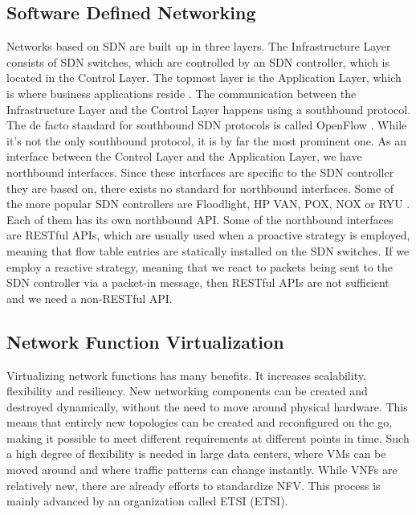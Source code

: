 \subsection{Software Defined Networking}
Networks based on \acs{SDN} are built up in three layers. The Infrastructure Layer consists of \acs{SDN} switches, which are controlled by an \acs{SDN} controller, which is located in the Control Layer. The topmost layer is the Application Layer, which is where business applications reside \cite{braun2014software}. The communication between the Infrastructure Layer and the Control Layer happens using a southbound protocol. The de facto standard for southbound \acs{SDN} protocols is called OpenFlow \cite{braun2014software}. While it's not the only southbound protocol, it is by far the most prominent one. As an interface between the Control Layer and the Application Layer, we have northbound interfaces. Since these interfaces are specific to the \acs{SDN} controller they are based on, there exists no standard for northbound interfaces. Some of the more popular \acs{SDN} controllers are Floodlight, HP VAN, POX, NOX or RYU \cite{tijare2016northbound}. Each of them has its own northbound \acs{API}. Some of the northbound interfaces are \acs{REST}ful \acsp{API}, which are usually used when a proactive strategy is employed, meaning that flow table entries are statically installed on the \acs{SDN} switches. If we employ a reactive strategy, meaning that we react to packets being sent to the \acs{SDN} controller via a packet-in message, then \acs{REST}ful \acsp{API} are not sufficient and we need a non-\acs{REST}ful \acs{API}. 
\subsection{Network Function Virtualization}
Virtualizing network functions has many benefits. It increases scalability, flexibility and resiliency. New networking components can be created and destroyed dynamically, without the need to move around physical hardware. This means that entirely new topologies can be created and reconfigured on the go, making it possible to meet different requirements at different points in time. Such a high degree of flexibility is needed in large data centers, where \acsp{VM} can be moved around and where traffic patterns can change instantly. While \acsp{VNF} are relatively new, there are already efforts to standardize \acs{NFV}. This process is mainly advanced by an organization called \acs{ETSI} (\acl{ETSI}).

